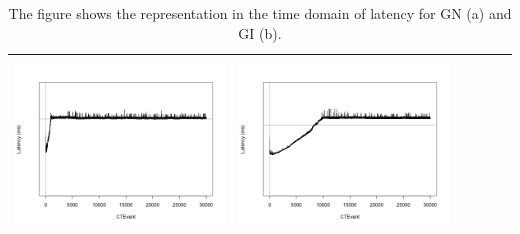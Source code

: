 \begin{table}[htbp]
{\begin{tabular}{l | ccccc}
\begin{minipage}{.15\textwidth}
				\vspace{2pt}
     			 	\includegraphics[width=\linewidth]{images/lat-log-graph/I14}
    				 \end{minipage}
    			   &	 \begin{minipage}{.15\textwidth}
     			 	
				\vspace{2pt}
     			 	\includegraphics[width=\linewidth]{images/lat-log-graph/I15}
    				 \end{minipage}\\
		\hline %
	 \end{tabular}
	}
	\caption[\textsc{Analyser} Investigation Stack - Level 2 - Pattern Identification - Latency - Baselines GN and GI]{The figure shows the  representation in the time domain of latency for GN (a) and GI (b).} 
 	\label{tab:level2-latency-graph}
\end{table}